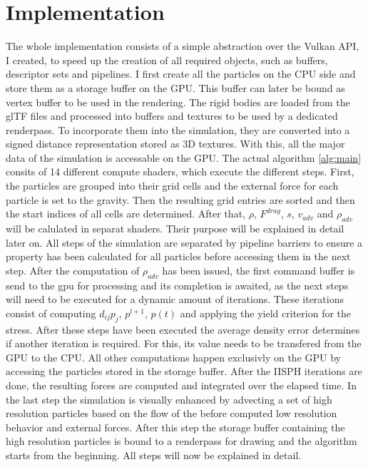 \documentclass[intern]{cgMA}
\begin{document}
    \section{Implementation}\label{sec:impl}
    The whole implementation consists of a simple abstraction over the Vulkan API, I created, to speed up the creation of all required objects, such as buffers, descriptor sets and pipelines. I first create all the particles on the CPU side and store them as a storage buffer on the GPU. This buffer can later be bound as vertex buffer to be used in the rendering. The rigid bodies are loaded from the glTF files and processed into buffers and textures to be used by a dedicated renderpass. To incorporate them into the simulation, they are converted into a signed distance representation stored as 3D textures. With this, all the major data of the simulation is accessable on the GPU.
    The actual algorithm \ref*{alg:main} consits of 14 different compute shaders, which execute the different steps. First, the particles are grouped into their grid cells and the external force for each particle is set to the gravity. Then the resulting grid entries are sorted and then the start indices of all cells are determined. After that, $\rho$, $F^{drag}$, $s$, $v_{adv}$ and $\rho_{adv}$ will be calulated in separat shaders. Their purpose will be explained in detail later on. All steps of the simulation are separated by pipeline barriers to ensure a property has been calculated for all particles before accessing them in the next step. After the computation of $\rho_{adv}$ has been issued, the first command buffer is send to the gpu for processing and its completion is awaited, as the next steps will need to be executed for a dynamic amount of iterations. These iterations consist of computing $d_{ij}p_{j}$, $p^{l+1}$, $p(t)$ and applying the yield criterion for the stress. After these steps have been executed the average density error determines if another iteration is required. For this, its value needs to be transfered from the GPU to the CPU. All other computations happen exclusivly on the GPU by accessing the particles stored in the storage buffer. After the IISPH iterations are done, the resulting forces are computed and integrated over the elapsed time. In the last step the simulation is visually enhanced by advecting a set of high resolution particles based on the flow of the before computed low resolution behavior and external forces. After this step the storage buffer containing the high resolution particles is bound to a renderpass for drawing and the algorithm starts from the beginning. All steps will now be explained in detail.
\end{document}
